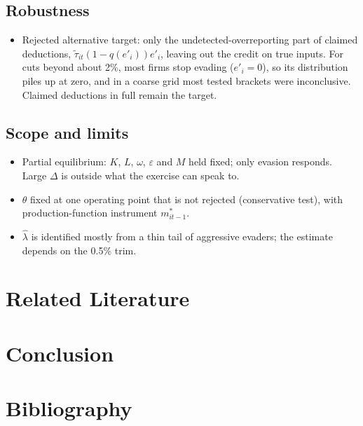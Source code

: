 \documentclass[
  12pt,
  letterpaper,
  oneside,
  openany]{report}
\providecommand{\tightlist}{%
  \setlength{\itemsep}{0pt}\setlength{\parskip}{0pt}}
\begin{document}
\section{Robustness}\label{sec-cf-robust}

\begin{itemize}
\tightlist
\item
  Rejected alternative target: only the undetected-overreporting part of
  claimed deductions, \(\tilde\tau_{it}(1-q(e'_i))e'_i\), leaving out
  the credit on true inputs. For cuts beyond about 2\%, most firms stop
  evading (\(e'_i=0\)), so its distribution piles up at zero, and in a
  coarse grid most tested brackets were inconclusive. Claimed deductions
  in full remain the target.
\end{itemize}

\section{Scope and limits}\label{sec-cf-limits}

\begin{itemize}
\tightlist
\item
  Partial equilibrium: \(K\), \(L\), \(\omega\), \(\varepsilon\) and
  \(M\) held fixed; only evasion responds. Large \(\Delta\) is outside
  what the exercise can speak to.
\item
  \(\theta\) fixed at one operating point that is not rejected
  (conservative test), with production-function instrument
  \(m^*_{it-1}\).
\item
  \(\hat\lambda\) is identified mostly from a thin tail of aggressive
  evaders; the estimate depends on the 0.5\% trim.
\end{itemize}


\chapter{Related Literature}\label{sec-literature}


\chapter{Conclusion}\label{sec-conclusion}


\chapter*{Bibliography}\label{bibliography}
\end{document}
